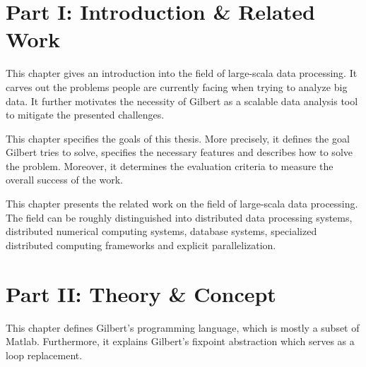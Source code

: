 \clearemptydoublepage

{}

\thispagestyle{empty}

\begin{center}
\end{center}

\section*{Part I: Introduction \& Related Work}


\noindent This chapter gives an introduction into the field of large-scala data processing. 
It carves out the problems people are currently facing when trying to analyze big data. 
It further motivates the necessity of Gilbert as a scalable data analysis tool to mitigate the presented challenges.

\vspace{1mm}


\noindent This chapter specifies the goals of this thesis. 
More precisely, it defines the goal Gilbert tries to solve, specifies the necessary features and describes how to solve the problem. 
Moreover, it determines the evaluation criteria to measure the overall success of the work.

\vspace{1mm}


\noindent This chapter presents the related work on the field of large-scala data processing. 
The field can be roughly distinguished into distributed data processing systems, distributed numerical computing systems, database systems, specialized distributed computing frameworks and explicit parallelization.

\vspace{1mm}

\section*{Part II: Theory \& Concept}


\noindent This chapter defines Gilbert's programming language, which is mostly a subset of Matlab. 
Furthermore, it explains Gilbert's fixpoint abstraction which serves as a loop replacement.

